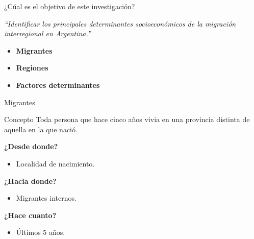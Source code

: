 \documentclass[11pt]{beamer}
\begin{document}









\begin{frame}[t]{¿Cúal es el objetivo de este investigación?}

\center \textit{ {\large ``Identificar los principales determinantes socioeconómicos de la migración interregional en Argentina.''}}
\vspace{1 cm}
\begin{itemize}
\pause
\item \textbf {Migrantes}
\pause
\item \textbf {Regiones}
\pause
\item \textbf {Factores determinantes}
\end{itemize}
\end{frame}



\begin{frame}[t]{Migrantes}
\begin{block}{Concepto}
Toda persona que hace cinco años vivia en una provincia distinta de aquella en la que nació.
\end{block}
\vspace{1 cm}

\pause
\textbf {¿Desde donde?}
\begin{itemize}
\item Localidad de nacimiento.
\end{itemize}

\pause

\textbf {¿Hacia donde?}
\begin{itemize}
\item Migrantes internos.
\end{itemize}
\pause
\textbf {¿Hace cuanto?}
\begin{itemize}
\item Últimos 5 años.
\end{itemize}

\end{frame}
\end{document}
